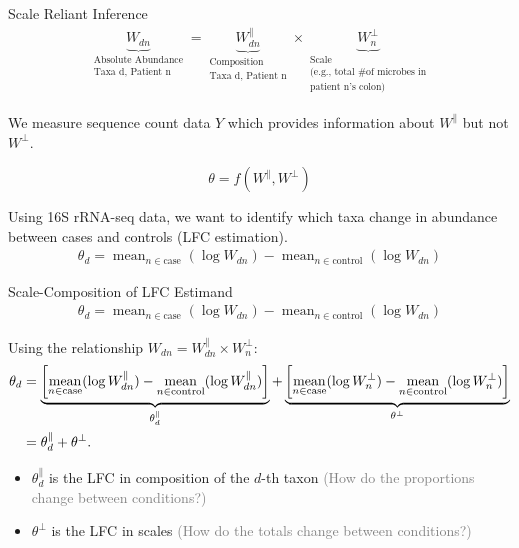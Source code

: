 \documentclass{beamer}
\DeclareMathOperator*{\mean}{mean}
\begin{document}
\begin{frame}[label={sec:org82e28ba}]{Scale Reliant Inference}
\begin{align*}
  \underbrace{W_{dn}}_{\substack{\text{Absolute Abundance} \\ \text{Taxa d, Patient n}}} = \underbrace{W^\parallel_{dn}}_{\substack{\text{Composition} \\ \text{Taxa d, Patient n} }} \times \underbrace{W^\perp_n}_{\substack{\text{Scale} \\ \text{(e.g., total \# of microbes in} \\ \text{patient n's colon)}}}
\end{align*}

\pause
We measure sequence count data \(Y\) which provides information about \(W^{\parallel}\) but not \(W^{\perp}\).

\pause

\[\theta=f(W^{\parallel}, W^{\perp})\]
\pause
\begin{example}\label{sec:orgd8e844c}
Using 16S rRNA-seq data, we want to identify which taxa change in abundance between cases and controls (LFC estimation).
\begin{align*}
  \theta_d = \mean_{n \in \text{case}}(\log W_{dn}) - \mean_{n \in \text{control}}(\log W_{dn} )
\end{align*}
\end{example}
\end{frame}
\begin{frame}[label={sec:org77ed647}]{Scale-Composition of LFC Estimand}
\begin{align*}
  \theta_d = \mean_{n \in \text{case}}(\log W_{dn}) - \mean_{n \in \text{control}}(\log W_{dn} )
\end{align*}


Using the relationship \(W_{dn} = W^\parallel_{dn} \times W^\perp_n\):
\small
\begin{align*}
  \small
  \theta_{d} &=  \underbrace{\left[\mean_{n \in \text{case}}(\log W^{\parallel}_{dn}) - \mean_{n \in \text{control}}(\log
  W^{\parallel}_{dn})\right]}_{\theta^\parallel_d}+\underbrace{\left[\mean_{n \in \text{case}}(\log W^{\perp}_{n}) - \mean_{n \in \text{control}}(\log W^{\perp}_{n})\right]}_{\theta^\perp} \label{eq:diff-analysis-2} \\
                       &= \theta_{d}^{\parallel}+\theta^\perp. \nonumber
\end{align*}

\pause

\begin{itemize}
\item \(\theta^{\parallel}_{d}\) is the LFC in composition of the \(d\)-th taxon \textcolor{gray}{(How do the proportions change between conditions?)}
\item \(\theta^{\perp}\) is the LFC in scales \textcolor{gray}{(How do the totals change between conditions?)}
\end{itemize}
\end{frame}
\end{document}
